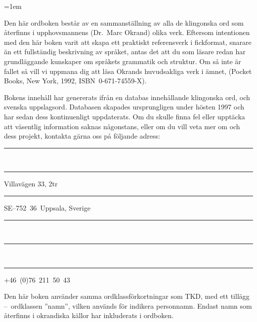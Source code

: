 %
%
%


\parindent=1em                                  %

\raggedbottom



\noindent Den här ordboken består av en sammanställning av alla de
klingonska ord som återfinns i upphovsmannens (Dr.\ Marc Okrand) olika
verk. Eftersom intentionen med den här boken varit att skapa ett
praktiskt referensverk i fickformat, snarare än ett fullständig
beskrivning av språket, antas det att du som läsare redan har
grundläggande kunskaper om språkets grammatik och struktur. Om så inte
är fallet så vill vi uppmana dig att läsa Okrands huvudsakliga verk i
ämnet,  (Pocket Books, New York, 1992,
ISBN~0-671-74559-X).

Bokens innehåll har genererats ifrån en databas innehållande
\fromkliwords{} klingonska ord, och \tokliwords{} svenska
uppslagsord. Databasen skapades ursprungligen under hösten 1997 och
har sedan dess kontinuenligt uppdaterats. Om du skulle finna fel eller
upptäcka att väsentlig information saknas någonstans, eller om du vill
veta mer om  och dess projekt,
kontakta gärna oss på följande adress:

\vspace{3mm}%
\noindent\parbox[t]{.5\textwidth}{%
  \rule{1cm}{0mm}\\
  \rule{1cm}{0mm}Villavägen 33, 2tr\\
  \rule{1cm}{0mm}SE--752~36~Uppsala, Sverige%
}%
\parbox[t]{.5\textwidth}{%
  \rule{1cm}{0mm}\\
  \rule{1cm}{0mm}\\
  \rule{1cm}{0mm}+46~(0)76~211~50~43%
}



\noindent Den här boken använder samma ordklassförkortningar som TKD,
med ett tillägg --~ordklassen ''namn'', vilken används för indikera
personnamn. Endast namn som återfinns i okrandiska källor har
inkluderats i ordboken.

